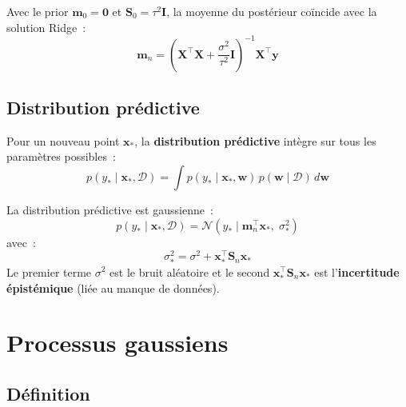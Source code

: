 \begin{remarque}
Avec le prior $\bm{m}_0 = \bm{0}$ et $\bm{S}_0 = \tau^2 \bm{I}$, la moyenne
du post\'erieur co\"incide avec la solution Ridge~:
\begin{equation}
  \bm{m}_n = \left(\bm{X}^\top\bm{X} + \frac{\sigma^2}{\tau^2}
  \bm{I}\right)^{-1}\bm{X}^\top\bm{y}
\end{equation}
\end{remarque}

\subsection{Distribution pr\'edictive}

\begin{definition}
Pour un nouveau point $\bm{x}_*$, la \textbf{distribution pr\'edictive}
int\`egre sur tous les param\`etres possibles~:
\begin{equation}
  p(y_* \mid \bm{x}_*, \mathcal{D}) = \int p(y_* \mid \bm{x}_*, \bm{w})\,
  p(\bm{w} \mid \mathcal{D})\, d\bm{w}
\end{equation}
\end{definition}

\begin{theoreme}
La distribution pr\'edictive est gaussienne~:
\begin{equation}
  p(y_* \mid \bm{x}_*, \mathcal{D}) = \mathcal{N}(y_* \mid \bm{m}_n^\top
  \bm{x}_*, \; \sigma_*^2)
  \label{eq:blr-predictive}
\end{equation}
avec~:
\begin{equation}
  \sigma_*^2 = \sigma^2 + \bm{x}_*^\top \bm{S}_n \bm{x}_*
\end{equation}
Le premier terme $\sigma^2$ est le bruit al\'eatoire et le second
$\bm{x}_*^\top \bm{S}_n \bm{x}_*$ est l'\textbf{incertitude \'epist\'emique}
(li\'ee au manque de donn\'ees).
\end{theoreme}

\section{Processus gaussiens}
\label{sec:gp}

\subsection{D\'efinition}

